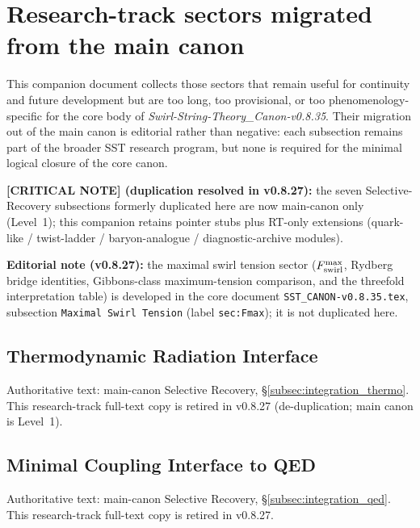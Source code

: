 \makeatletter
{}
\makeatother

\providecommand{\rhoRef}{{\rho_{\mathrm{ref}}}}

\section{Research-track sectors migrated from the main canon}

\noindent
This companion document collects those sectors that remain useful for continuity and future development but are too long, too provisional, or too phenomenology-specific for the core body of \textit{Swirl-String-Theory\_Canon-v0.8.35}. Their migration out of the main canon is editorial rather than negative: each subsection remains part of the broader SST research program, but none is required for the minimal logical closure of the core canon.

\medskip
\noindent
\textbf{[CRITICAL NOTE] (duplication resolved in v0.8.27):} the seven Selective-Recovery subsections formerly duplicated here are now main-canon only (Level~1); this companion retains pointer stubs plus RT-only extensions (quark-like / twist-ladder / baryon-analogue / diagnostic-archive modules).

\medskip
\noindent
\textbf{Editorial note (v0.8.27):} the maximal swirl tension sector ($F_{\rm swirl}^{\max}$, Rydberg bridge identities, Gibbons-class maximum-tension comparison, and the threefold interpretation table) is developed in the core document \texttt{SST\_CANON-v0.8.35.tex}, subsection \texttt{Maximal Swirl Tension} (label \texttt{sec:Fmax}); it is not duplicated here.

\medskip








\subsection{Thermodynamic Radiation Interface}
\noindent
Authoritative text: main-canon Selective Recovery, \S\ref{subsec:integration_thermo}. This research-track full-text copy is retired in v0.8.27 (de-duplication; main canon is Level~1).

\subsection{Minimal Coupling Interface to QED}
\noindent
Authoritative text: main-canon Selective Recovery, \S\ref{subsec:integration_qed}. This research-track full-text copy is retired in v0.8.27.

